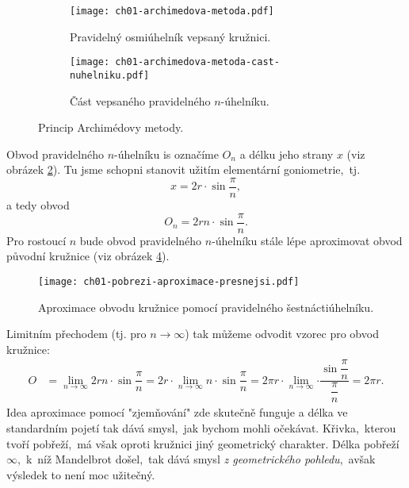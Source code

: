 \begin{figure}[h]
    \centering
    \begin{subfigure}{\subfigwidth}
        \centering
        \texttt{[image: ch01-archimedova-metoda.pdf]}
        \caption{Pravidelný osmiúhelník vepsaný kružnici.}
        \label{subfig:archimedova_metoda}
    \end{subfigure}
    \quad
    \begin{subfigure}{\subfigwidth}
        \centering
        \texttt{[image: ch01-archimedova-metoda-cast-nuhelniku.pdf]}
        \caption{Část vepsaného pravidelného $n$-úhelníku.}
        \label{subfig:archimedova_metoda_cast_nuhelniku}
    \end{subfigure}
    \caption{Princip Archimédovy metody.}
    \label{fig:princip_archimedovy_metody}
\end{figure}
Obvod pravidelného $n$-úhelníku is označíme $O_n$ a délku jeho strany $x$ (viz obrázek \ref{subfig:archimedova_metoda_cast_nuhelniku}). Tu jsme schopni stanovit užitím elementární goniometrie,~tj.
\begin{equation*}
    x=2r\cdot\sin{\dfrac{\pi}{n}},
\end{equation*}
a tedy obvod
\begin{equation*}
    O_n=2rn\cdot\sin{\dfrac{\pi}{n}}.
\end{equation*}
Pro rostoucí $n$ bude obvod pravidelného $n$-úhelníku stále lépe aproximovat obvod původní kružnice (viz obrázek \ref{fig:archimedova_metoda_presnejsi}).
\begin{figure}[h]
    \centering
    \texttt{[image: ch01-pobrezi-aproximace-presnejsi.pdf]}
    \caption{Aproximace obvodu kružnice pomocí pravidelného šestnáctiúhelníku.}
    \label{fig:archimedova_metoda_presnejsi}
\end{figure}
Limitním přechodem (tj. pro $n\to\infty$) tak můžeme odvodit vzorec pro obvod kružnice:
\begin{align*}
    O&=\lim_{n\to\infty}{2rn\cdot\sin{\dfrac{\pi}{n}}}=2r\cdot\lim_{n\to\infty}{n\cdot\sin{\dfrac{\pi}{n}}}=2\pi r\cdot\lim_{n\to\infty}{\cdot\dfrac{\sin{\dfrac{\pi}{n}}}{\dfrac{\pi}{n}}}=2\pi r.
\end{align*}
Idea aproximace pomocí "zjemňování" zde skutečně funguje a délka ve standardním pojetí tak dává smysl,~jak bychom mohli očekávat. Křivka,~kterou tvoří pobřeží,~má však oproti kružnici jiný geometrický charakter. Délka pobřeží $\infty$,~k~níž Mandelbrot došel,~tak dává smysl \emph{z geometrického pohledu},~avšak výsledek to není moc užitečný.